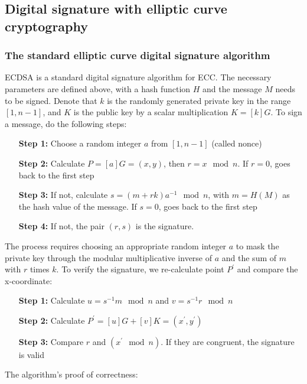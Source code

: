 \subsection{Digital signature with elliptic curve cryptography}

\subsubsection{The standard elliptic curve digital signature algorithm}
ECDSA is a standard digital signature algorithm for ECC. The necessary parameters are defined above, with a hash function $H$ and the message $M$ needs to be signed. Denote that $k$ is the randomly generated private key in the range  $[1, n - 1]$, and $K$ is the public key by a scalar multiplication $K =[k]G$. To sign a message, do the following steps:

\begin{itemize}[leftmargin=2.2cm]
  \item[\textbf{Step 1:}] Choose a random integer $a$ from $[1, n - 1]$ (called nonce)
  \item[\textbf{Step 2:}] Calculate $P = [a]G = (x, y)$, then $r = x \mod n$. If $r = 0$, goes back to the first step
  \item[\textbf{Step 3:}] If not, calculate $s=(m+rk) a^{-1} \mod n$, with $m = H(M)$ as the hash value of the message. If $s = 0$, goes back to the first step
  \item[\textbf{Step 4:}] If not, the pair $(r, s)$ is the signature.
\end{itemize}

The process requires choosing an appropriate random integer $a$ to mask the private key through the modular multiplicative inverse of $a$ and the sum of $m$ with $r$ times $k$. To verify the signature, we re-calculate point $P^\prime$ and compare the x-coordinate:

\begin{itemize}[leftmargin=2.2cm]
  \item[\textbf{Step 1:}] Calculate $u = s^{-1} m \mod n$ and $v = s^{-1} r \mod n$
  \item[\textbf{Step 2:}] Calculate $P^\prime = [u]G + [v]K = (x^\prime, y^\prime)$
  \item[\textbf{Step 3:}] Compare $r$ and $(x^\prime \mod n)$. If they are congruent, the signature is valid
\end{itemize}

The algorithm’s proof of correctness:

